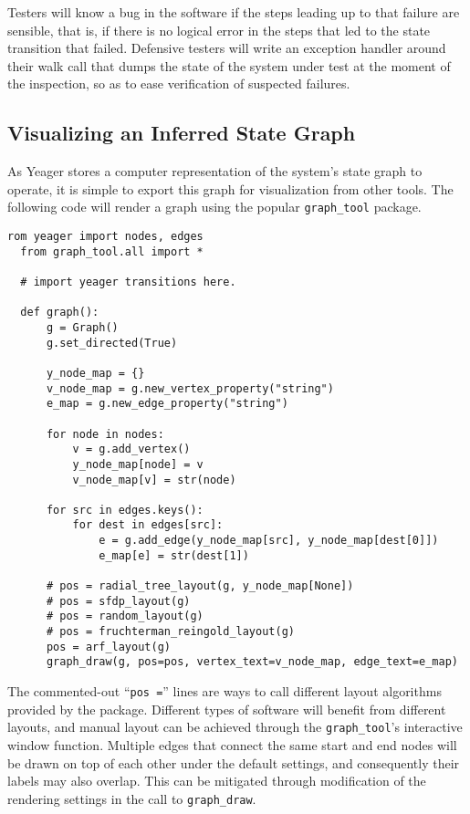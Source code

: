 Testers will know a bug in the software if the steps leading up to that failure are sensible, that is, if there is no logical error in the steps that led to the state transition that failed. Defensive testers will write an exception handler around their walk call that dumps the state of the system under test at the moment of the inspection, so as to ease verification of suspected failures.

\subsection{Visualizing an Inferred State Graph}

As Yeager stores a computer representation of the system's state graph to operate, it is simple to export this graph for visualization from other tools. The following code will render a graph using the popular \texttt{graph\_tool} package.

\begin{Verbatim}[fontsize=\small, baselinestretch=0.75]
  rom yeager import nodes, edges
  from graph_tool.all import *

  # import yeager transitions here.

  def graph():
      g = Graph()
      g.set_directed(True)

      y_node_map = {}
      v_node_map = g.new_vertex_property("string")
      e_map = g.new_edge_property("string")

      for node in nodes:
          v = g.add_vertex()
          y_node_map[node] = v
          v_node_map[v] = str(node)

      for src in edges.keys():
          for dest in edges[src]:
              e = g.add_edge(y_node_map[src], y_node_map[dest[0]])
              e_map[e] = str(dest[1])

      # pos = radial_tree_layout(g, y_node_map[None])
      # pos = sfdp_layout(g)
      # pos = random_layout(g)
      # pos = fruchterman_reingold_layout(g)
      pos = arf_layout(g)
      graph_draw(g, pos=pos, vertex_text=v_node_map, edge_text=e_map)
\end{Verbatim}

The commented-out ``\texttt{pos =}'' lines are ways to call different layout algorithms provided by the package. Different types of software will benefit from different layouts, and manual layout can be achieved through the \texttt{graph\_tool}'s interactive window function. Multiple edges that connect the same start and end nodes will be drawn on top of each other under the default settings, and consequently their labels may also overlap. This can be mitigated through modification of the rendering settings in the call to \texttt{graph\_draw}.

